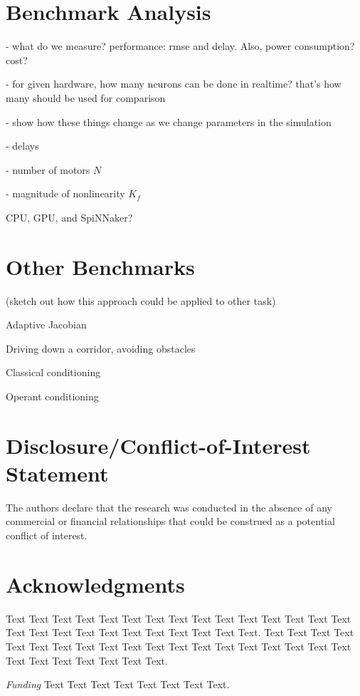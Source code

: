 \documentclass{frontiersSCNS} %
\begin{document}
\section{Benchmark Analysis}

- what do we measure?   performance: rmse and delay.  Also, power consumption?  cost?

- for given hardware, how many neurons can be done in realtime?  that's how many should be used for comparison

- show how these things change as we change parameters in the simulation

- delays

- number of motors $N$

- magnitude of nonlinearity $K_f$

CPU, GPU, and SpiNNaker?

\section{Other Benchmarks}

(sketch out how this approach could be applied to other task)

Adaptive Jacobian

Driving down a corridor, avoiding obstacles

Classical conditioning

Operant conditioning 


\section*{Disclosure/Conflict-of-Interest Statement}

The authors declare that the research was conducted in the absence of any commercial or financial relationships that could be construed as a potential conflict of interest.

\section*{Acknowledgments}
Text Text Text Text Text Text  Text Text Text Text Text Text Text Text  Text Text Text Text Text Text Text Text Text  Text Text Text. Text Text Text Text Text Text  Text Text Text Text Text Text Text Text  Text Text Text Text Text Text Text Text Text  Text Text Text. 

\textit{Funding\textcolon} Text Text Text Text Text Text  Text Text.


\end{document}
